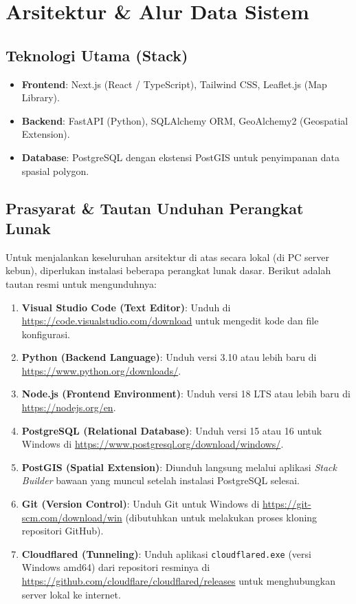 \documentclass[12pt, a4paper]{article}
\begin{document}
\newpage

\section{Arsitektur \& Alur Data Sistem}

\subsection{Teknologi Utama (Stack)}
\begin{itemize}
    \item \textbf{Frontend}: Next.js (React / TypeScript), Tailwind CSS, Leaflet.js (Map Library).
    \item \textbf{Backend}: FastAPI (Python), SQLAlchemy ORM, GeoAlchemy2 (Geospatial Extension).
    \item \textbf{Database}: PostgreSQL dengan ekstensi PostGIS untuk penyimpanan data spasial polygon.
\end{itemize}

\subsection{Prasyarat \& Tautan Unduhan Perangkat Lunak}
Untuk menjalankan keseluruhan arsitektur di atas secara lokal (di PC server kebun), diperlukan instalasi beberapa perangkat lunak dasar. Berikut adalah tautan resmi untuk mengunduhnya:
\begin{enumerate}
    \item \textbf{Visual Studio Code (Text Editor)}: Unduh di \url{https://code.visualstudio.com/download} untuk mengedit kode dan file konfigurasi.
    \item \textbf{Python (Backend Language)}: Unduh versi 3.10 atau lebih baru di \url{https://www.python.org/downloads/}.
    \item \textbf{Node.js (Frontend Environment)}: Unduh versi 18 LTS atau lebih baru di \url{https://nodejs.org/en}.
    \item \textbf{PostgreSQL (Relational Database)}: Unduh versi 15 atau 16 untuk Windows di \url{https://www.postgresql.org/download/windows/}.
    \item \textbf{PostGIS (Spatial Extension)}: Diunduh langsung melalui aplikasi \textit{Stack Builder} bawaan yang muncul setelah instalasi PostgreSQL selesai.
    \item \textbf{Git (Version Control)}: Unduh Git untuk Windows di \url{https://git-scm.com/download/win} (dibutuhkan untuk melakukan proses kloning repositori GitHub).
    \item \textbf{Cloudflared (Tunneling)}: Unduh aplikasi \texttt{cloudflared.exe} (versi Windows amd64) dari repositori resminya di \url{https://github.com/cloudflare/cloudflared/releases} untuk menghubungkan server lokal ke internet.
\end{enumerate}
\end{document}
